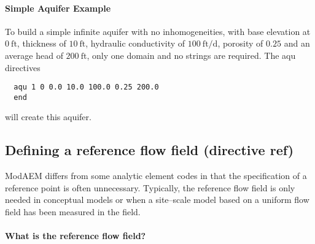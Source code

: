 \paragraph{Simple Aquifer Example }

To build a simple infinite aquifer with no inhomogeneities, with base elevation at $0\mathrm{\ ft}$, thickness of $10\mathrm{\ ft}$, hydraulic conductivity of $100\mathrm{\ ft/d}$, porosity of $0.25$ and an average head of $200\mathrm{\ ft}$,
only one domain and no strings are required. The \textsf{aqu} directives
\begin{verbatim}
  aqu 1 0 0.0 10.0 100.0 0.25 200.0
  end
\end{verbatim}
will create this aquifer.

\subsection{Defining a reference flow field (directive \textsf{ref})
\label{sub:reference-flow-field}}

ModAEM differs from some analytic element codes in that the specification of a reference point is often unnecessary. Typically, the reference flow field is only needed in conceptual models or when a site--scale model based on a uniform flow field has been measured in the field.

\paragraph{What is the reference flow field?}


